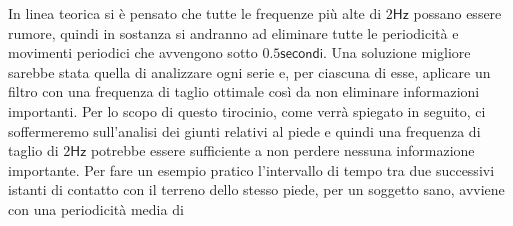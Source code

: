 In linea teorica si è pensato che tutte le frequenze più alte di $2\mathsf{Hz}$ possano essere rumore,
quindi in sostanza si andranno ad eliminare tutte le periodicità e movimenti periodici 
che avvengono sotto $0.5 \mathsf{secondi}$. Una soluzione migliore sarebbe stata quella di analizzare
ogni serie e, per ciascuna di esse, aplicare un filtro con una frequenza di taglio ottimale così da
non eliminare informazioni importanti. Per lo scopo di questo tirocinio, come verrà spiegato in seguito,
ci soffermeremo sull'analisi dei giunti relativi al piede e quindi una frequenza di taglio di $2\mathsf{Hz}$
potrebbe essere sufficiente a non perdere nessuna informazione importante.
Per fare un esempio pratico l'intervallo di tempo tra due successivi istanti di contatto con il
terreno dello stesso piede, per un soggetto sano, avviene con una periodicità media di 